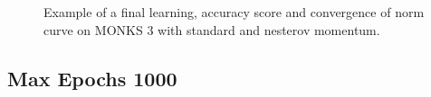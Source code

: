 \begin{appendices}
\begin{figure}[H]
\begin{subfigure}{0.40\textwidth}
                    \label{fig:monks_3_ACC_SGD}
                \end{subfigure}
                \begin{subfigure}{0.40\textwidth}
                    \caption{}
                    \label{fig:monks_3_NORM_SGD}
                \end{subfigure}
                \caption{Example of a final learning, accuracy score and convergence of norm curve on MONKS 3 with standard and nesterov momentum.}
                \label{fig:monks_3_SGD}
            \end{figure}

            \subsection{Max Epochs 1000}


\end{appendices}
